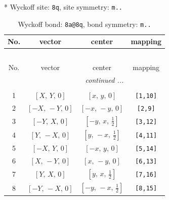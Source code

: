 \documentclass[fleqn,8pt]{jsarticle}
\begin{document}
* Wyckoff site: {\tt 8q}, site symmetry: {\tt m..}
\renewcommand{\arraystretch}{1.2}
\begin{longtable}{cccc}
\caption{Wyckoff bond: {\tt 8a@8q}, bond symmetry: {\tt m..}}
 \\
 \hline \hline
No. & vector & center & mapping \\ \hline \endfirsthead

\multicolumn{3}{l}{\tablename\ \thetable{}} \\
 \hline \hline
No. & vector & center & mapping \\ \hline \endhead

 \hline \hline
\multicolumn{3}{r}{\footnotesize\it continued ...} \\ \endfoot

 \hline \hline
\multicolumn{3}{r}{} \\ \endlastfoot

1 & $\left[ X,\, Y,\, 0 \right]$ & $\left[ x,\, y,\, 0 \right]$ & {\tt [1,10]} \\ \hline
2 & $\left[ - X,\, - Y,\, 0 \right]$ & $\left[ - x,\, - y,\, 0 \right]$ & {\tt [2,9]} \\ \hline
3 & $\left[ - Y,\, X,\, 0 \right]$ & $\left[ - y,\, x,\, \frac{1}{2} \right]$ & {\tt [3,12]} \\ \hline
4 & $\left[ Y,\, - X,\, 0 \right]$ & $\left[ y,\, - x,\, \frac{1}{2} \right]$ & {\tt [4,11]} \\ \hline
5 & $\left[ - X,\, Y,\, 0 \right]$ & $\left[ - x,\, y,\, 0 \right]$ & {\tt [5,14]} \\ \hline
6 & $\left[ X,\, - Y,\, 0 \right]$ & $\left[ x,\, - y,\, 0 \right]$ & {\tt [6,13]} \\ \hline
7 & $\left[ Y,\, X,\, 0 \right]$ & $\left[ y,\, x,\, \frac{1}{2} \right]$ & {\tt [7,16]} \\ \hline
8 & $\left[ - Y,\, - X,\, 0 \right]$ & $\left[ - y,\, - x,\, \frac{1}{2} \right]$ & {\tt [8,15]} \\
\end{longtable}
\renewcommand{\arraystretch}{1.2}
\end{document}
